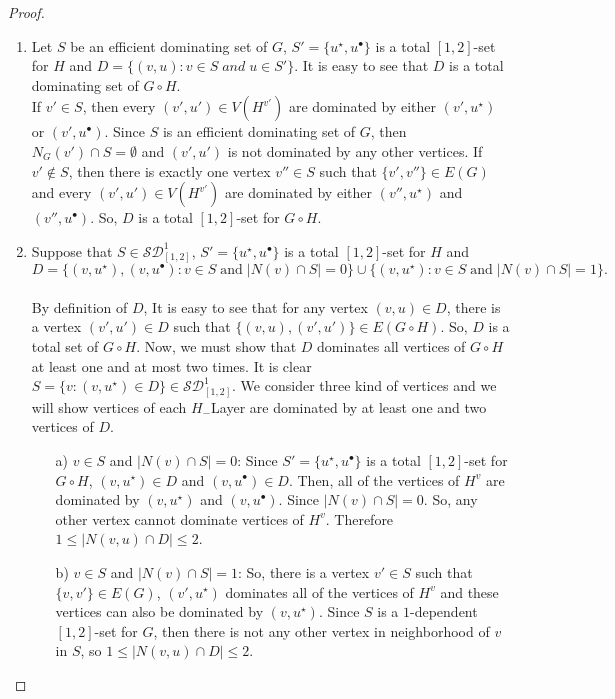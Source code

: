 \documentclass[A4,12pt]{article}
\theoremstyle{definition}
\theoremstyle{remark}
\begin{document}
\begin{proof}
\begin{enumerate}
  \item
 Let $S$ be an efficient dominating set of $G$, $S'=\{ u^{\star},u^{\bullet}\}$  is a total $[1,2]$-set for $H$ and $D=\{(v,u): v\in S\;and\;u\in S'\}$. It is easy to see that $D$ is a total dominating set of $G \circ H$.
 \\
  If $v'\in S$, then every  $(v',u') \in V(H^{v'})$ are dominated by  either $(v', u^{\star})$ or $(v', u^{\bullet})$. Since $S$ is an efficient dominating set of $G$, then $N_G(v')\cap S= \emptyset$ and $(v',u')$ is not dominated by any other vertices.
   If $v'\notin S$, then there is exactly one vertex $v''\in S$  such that $\{v',v''\}\in E(G)$ and every  $(v',u') \in V(H^{v'})$ are dominated by  either $(v'', u^{\star})$ and $(v'', u^{\bullet})$. So, $D$ is a total $[1,2]$-set for $G \circ H$.
  \item
Suppose that $S\in \mathcal{SD}^1_{[1,2]}$, $S'=\{ u^{\star},u^{\bullet}\}$ is a total $[1,2]$-set for $H$ and
$$D=\{(v,u^{\star}),(v,u^{\bullet}):v\in S\;\text{and} \;\vert  N(v)\cap S\vert  =0 \} \cup \{(v,u^{\star}):v\in S\;\text{and} \;\vert  N(v)\cap S\vert  =1 \} .$$
\\
 By definition of $D$, It is easy to see that for any vertex $(v,u) \in D$, there is a vertex $(v',u')\in D$ such that $\{(v,u),(v',u')\} \in E(G\circ H)$. So, $D$ is a total set of $G \circ H$. Now, we must show that $D$ dominates all vertices of  $G \circ H$ at least one and at most two times. It is clear $S=\{ v: (v,u^{\star})\in D\}\in \mathcal{SD}^1_{[1,2]}$. We consider three kind of vertices and we will show vertices of each $H_{-}$Layer are dominated by at least one and two vertices of $D$.
\begin{enumerate}
\item [a)] $v \in S$ and $\vert  N(v)\cap S\vert  =0$:
Since $S'=\{ u^{\star},u^{\bullet}\}$ is a total $[1,2]$-set for $G \circ H$, $(v,u^{\star})\in D$ and $(v,u^{\bullet})\in D$. Then, all of the vertices of  $H^v$ are dominated by   $(v,u^{\star})$ and $(v,u^{\bullet})$. Since $\vert  N(v)\cap S\vert  =0$. So, any other vertex cannot dominate vertices of $H^v$. Therefore $1\leq\vert  N(v,u)\cap D\vert  \leq 2$.
\\
\item [b)] $v \in S$ and $\vert  N(v)\cap S\vert  =1$:
 So, there is a vertex $v' \in S$ such that $\{v,v'\} \in E(G)$, $(v', u^{\star})$  dominates all of the vertices of $H^v$ and these vertices can also be dominated by  $(v, u^{\star})$. Since $S$ is a $1$-dependent $[1,2]$-set for $G$, then there is not any other vertex in neighborhood of $v$ in $S$, so $1\leq\vert  N(v,u)\cap D\vert  \leq 2$.

\end{enumerate}
\end{enumerate}
\end{proof}
\end{document}
